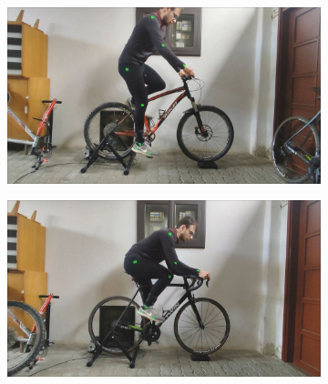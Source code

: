 \begin{figure}[htb]
    \begin{subfigure}[b]{\imgwidth}
        \centering

        \includegraphics[width=1\linewidth]{obrazky-figures/4.jpg}

    \end{subfigure}
    \hfill
    \begin{subfigure}[b]{\imgwidth}
        \centering

        \includegraphics[width=1\linewidth]{obrazky-figures/5.jpg}

    \end{subfigure}
    \hfill
    \begin{subfigure}[b]{\imgwidth}
        \centering


\end{subfigure}
\end{figure}
